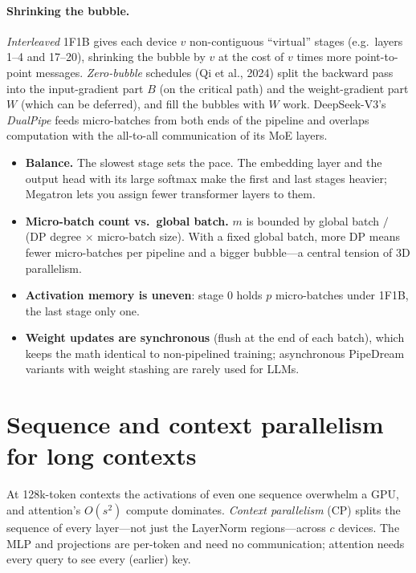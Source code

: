 \paragraph{Shrinking the bubble.} \emph{Interleaved} 1F1B gives each device $v$ non-contiguous
``virtual'' stages (e.g.\ layers 1--4 and 17--20), shrinking the bubble by $v$ at the cost of
$v$ times more point-to-point messages. \emph{Zero-bubble} schedules (Qi et al., 2024) split the
backward pass into the input-gradient part $B$ (on the critical path) and the weight-gradient
part $W$ (which can be deferred), and fill the bubbles with $W$ work. DeepSeek-V3's
\emph{DualPipe} feeds micro-batches from both ends of the pipeline and overlaps
computation with the all-to-all communication of its MoE layers.

\begin{systemslens}
\begin{itemize}
\item \textbf{Balance.} The slowest stage sets the pace. The embedding layer and the output
  head with its large softmax make the first and last stages heavier; Megatron lets you assign
  fewer transformer layers to them.
\item \textbf{Micro-batch count vs.\ global batch.} $m$ is bounded by global batch $/$ (DP
  degree $\times$ micro-batch size). With a fixed global batch, more DP means fewer micro-batches
  per pipeline and a bigger bubble---a central tension of 3D parallelism.
\item \textbf{Activation memory is uneven}: stage 0 holds $p$ micro-batches under 1F1B, the last
  stage only one.
\item \textbf{Weight updates are synchronous} (flush at the end of each batch), which keeps the
  math identical to non-pipelined training; asynchronous PipeDream variants with weight
  stashing are rarely used for LLMs.
\end{itemize}
\end{systemslens}

\section{Sequence and context parallelism for long contexts}\label{sec:dist:cp}

At 128k-token contexts the activations of even one sequence overwhelm a GPU, and attention's
$O(s^2)$ compute dominates. \emph{Context parallelism} (CP) splits the sequence of every
layer---not just the LayerNorm regions---across $c$ devices. The MLP and projections are
per-token and need no communication; attention needs every query to see every (earlier) key.

